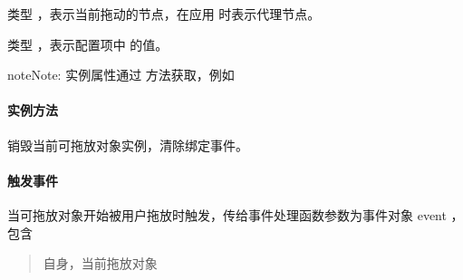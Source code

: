 \documentclass[letterpaper,10pt,english]{sphinxmanual}
\begin{document}
\begin{fulllineitems}
\label{api/component/dd/draggable:DD.Draggable.node}
类型  ，表示当前拖动的节点，在应用  时表示代理节点。

\end{fulllineitems}



\begin{fulllineitems}
\label{api/component/dd/draggable:DD.Draggable.dragNode}
类型  ，表示配置项中 {\hyperref[api/component/dd/draggable:DD.Draggable.config.node]{}} 的值。

\end{fulllineitems}


\begin{notice}{note}{Note:}
实例属性通过  方法获取，例如 
\end{notice}


\paragraph{实例方法}
\label{api/component/dd/draggable:id5}

\begin{fulllineitems}
\label{api/component/dd/draggable:DD.Draggable.destroy}
销毁当前可拖放对象实例，清除绑定事件。

\end{fulllineitems}



\paragraph{触发事件}
\label{api/component/dd/draggable:id6}\label{api/component/dd/draggable:draggable-events}

\begin{fulllineitems}
\label{api/component/dd/draggable:DD.Draggable.dragstart}
当可拖放对象开始被用户拖放时触发，传给事件处理函数参数为事件对象 event ，包含
\begin{quote}


\begin{fulllineitems}
\label{api/component/dd/draggable:DD.Draggable.dragstart.event.drag}
自身，当前拖放对象

\end{fulllineitems}

\end{quote}

\end{fulllineitems}
\end{document}
